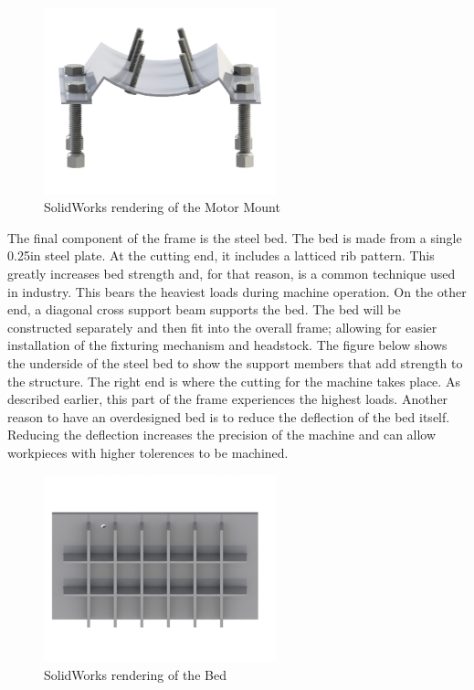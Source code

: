 \begin{figure}[H]
    \centering
    \includegraphics[width=0.6\textwidth]{./images/Chapter2-MachineDescription/MotorMount}
    \caption{SolidWorks rendering of the Motor Mount}
    \label{fig:Motor Mount}
\end{figure}

The final component of the frame is the steel bed. The bed is made from a single 0.25in steel plate. At the cutting end, it includes a latticed rib pattern. This greatly increases bed strength and, for that reason, is a common technique used in industry. This bears the heaviest loads during machine operation. On the other end, a diagonal cross support beam supports the bed. The bed will be constructed separately and then fit into the overall frame; allowing for easier installation of the fixturing mechanism and headstock. The figure below shows the underside of the steel bed to show the support members that add strength to the structure. The right end is where the cutting for the machine takes place. As described earlier, this part of the frame experiences the highest loads. Another reason to have an overdesigned bed is to reduce the deflection of the bed itself. Reducing the deflection increases the precision of the machine and can allow workpieces with higher tolerences to be machined. 

\begin{figure}[H]
    \centering
    \includegraphics[width=0.6\textwidth]{./images/Chapter2-MachineDescription/Bed}
    \caption{SolidWorks rendering of the Bed}
    \label{fig:Bed}
\end{figure}

